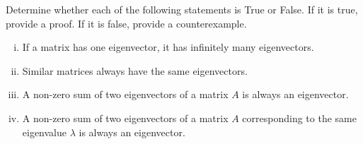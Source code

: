 \begin{question}
\normalfont
Determine whether each of the following statements is True or False. If it is true, provide a proof. If it is false, provide a counterexample. 
\begin{enumerate}[(i)]

\item If a matrix has one eigenvector, it has infinitely many eigenvectors.

\item Similar matrices always have the same eigenvectors.

\item A non-zero sum of two eigenvectors of a matrix $A$ is always an eigenvector.

\item A non-zero sum of two eigenvectors of a matrix $A$ corresponding to the same eigenvalue $\lambda$ is always an eigenvector. 

\end{enumerate}

\end{question}
